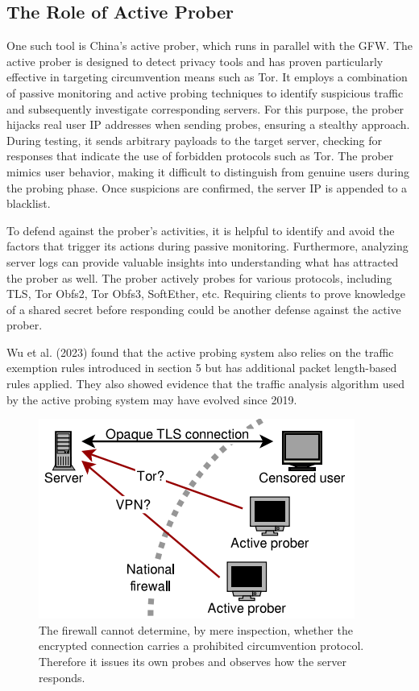 \subsection{The Role of Active Prober}
One such tool is China's active prober, which runs in parallel with the GFW. The active prober is designed to detect privacy tools and has proven particularly effective in targeting circumvention means such as Tor. It employs a combination of passive monitoring and active probing techniques to identify suspicious traffic and subsequently investigate corresponding servers. For this purpose, the prober hijacks real user IP addresses when sending probes, ensuring a stealthy approach. During testing, it sends arbitrary payloads to the target server, checking for responses that indicate the use of forbidden protocols such as Tor. The prober mimics user behavior, making it difficult to distinguish from genuine users during the probing phase. Once suspicions are confirmed, the server IP is appended to a blacklist.\cite{ensafi2015firewall}

To defend against the prober's activities, it is helpful to identify and avoid the factors that trigger its actions during passive monitoring. Furthermore, analyzing server logs can provide valuable insights into understanding what has attracted the prober as well. The prober actively probes for various protocols, including TLS, Tor Obfs2, Tor Obfs3, SoftEther, etc. Requiring clients to prove knowledge of a shared secret before responding could be another defense against the active prober.\cite{ensafi2015firewall}

Wu et al. (2023) found that the active probing system also relies on the traffic exemption rules introduced in section 5 but has additional packet length-based rules applied. They also showed evidence that the traffic analysis algorithm used by the active probing system may have evolved since 2019.\cite{wu2023great}

\begin{figure}[tp]
	\centering
	\includegraphics{figures/ActiveProber}
	\caption{
		The firewall cannot determine, by mere inspection, whether the encrypted connection carries a prohibited circumvention protocol. Therefore it issues its own probes and observes how the server responds.\cite{ensafi2015firewall}
		}
\end{figure}

